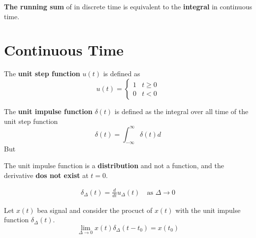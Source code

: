 \begin{remark}
    \textbf{The running sum} of in discrete time is equivalent to the \textbf{integral} in continuous time.
\end{remark}

\section{Continuous Time}
\begin{definition}
    The \textbf{unit step function} $u(t)$ is defined as
    $$ u(t) = \begin{cases}
            1 & t \geq 0 \\
            0 & t < 0
        \end{cases} $$
\end{definition}

\begin{definition}
    The \textbf{unit impulse function} $\delta(t)$ is defined as the integral over all time of the unit step function
    $$ \delta(t) = \int_{-\infty}^{\infty} \delta(t) d$$
    But
\end{definition}

\begin{remark}
    The unit impulse function is a \textbf{distribution} and not a function, and the derivative \textbf{dos not exist} at $t = 0$.
\end{remark}

\begin{corollary}
    \begin{align*}
        \delta_{\Delta} (t) = \frac{d}{dt} u_{\Delta}(t) \quad \text{as } \Delta \to 0
    \end{align*}
\end{corollary}



\begin{theorem}
    Let $x(t)$ bea signal and consider the procuct of $x(t)$ with the unit impulse function $\delta_{\Delta}(t)$.
    $$ \lim_{\Delta \to 0} x(t) \delta_{\Delta}(t - t_0) = x(t_0) $$
\end{theorem}